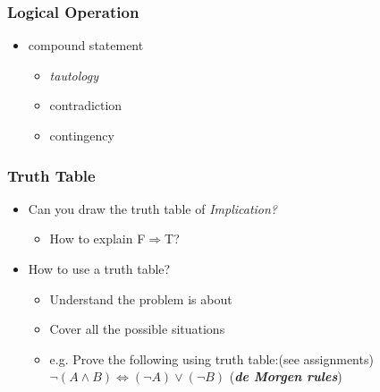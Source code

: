 \documentclass{beamer}
\newcommand{\myfont}{\rmfamily\normalsize\upshape\mdseries}
\begin{document}
\begin{frame}
    \frametitle{Logical Operation}
    \begin{table}
        \centering
    \end{table}
    \begin{itemize}
    \item  compound statement
    \begin{itemize}
        \item \itshape tautology
        \item contradiction
        \item contingency
    \end{itemize}
\end{itemize}
\end{frame}
\begin{frame}
    \frametitle{Truth Table}
    \begin{itemize}
        \item Can you draw the truth table of \itshape Implication?
            \begin{itemize}
                \myfont
                \item How to explain F$\Rightarrow$T?
            \end{itemize}
        \myfont
        \item How to use a truth table?
        \begin{itemize}
            \item Understand the problem is about
            \item Cover all the possible situations
            \item e.g. Prove the following using truth table:(see assignments) \\
                \vspace*{1em}
                \* \* \* \* \* \* \* \*
                    $\neg(A\wedge B)\Leftrightarrow(\neg A)\vee(\neg B)$ \* \* \* \* 
                (\textbf{\itshape de Morgen rules})
        \end{itemize}
    \end{itemize}
    \vspace*{5em}
\end{frame}
\end{document}
